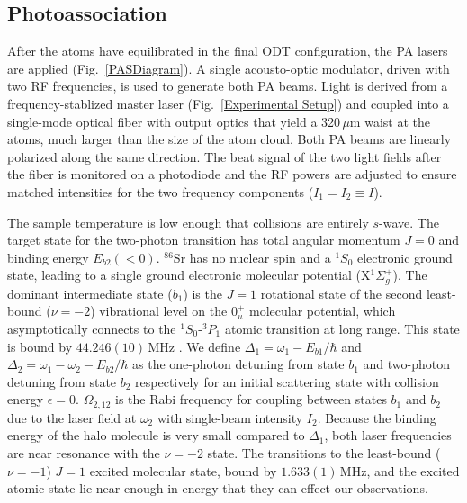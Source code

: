 \subsection{Photoassociation}

After the atoms have equilibrated in the final ODT configuration, the PA lasers are applied (Fig.\ \ref{PASDiagram}). A single acousto-optic modulator, driven with two RF frequencies, is used to generate both PA beams. Light is derived from a frequency-stablized master laser (Fig.\ \ref{Experimental Setup}) and coupled into a single-mode optical fiber with output optics that yield a 320\,$\mu$m waist at the atoms, much larger than the size of the atom cloud. Both PA beams are linearly polarized along the same direction. The beat signal of the two light fields after the fiber is monitored on a photodiode and the RF powers are adjusted to ensure matched intensities for the two frequency components ($I_1=I_2\equiv I$).



The sample temperature is low enough that collisions are entirely $s$-wave. The target state for the two-photon transition has total angular momentum $J=0$ and binding energy $E_{b2}(<0)$. $^{86}$Sr has no nuclear spin and a $^1S_0$ electronic ground state, leading to a single ground electronic molecular potential (X$^1\Sigma_g^+$). The dominant intermediate state ($b_1$) is the $J=1$ rotational state of the second least-bound ($\nu=-2$) vibrational level on the $0^+_u$ molecular potential, which asymptotically connects to the $^1S_0$-$^3P_1$ atomic transition at long range. This state is bound by $44.246(10)$\,MHz \cite{bmc14}. We define $\Delta_1=\omega_1-E_{b1}/\hbar$ and $\Delta_2=\omega_1-\omega_2-E_{b2}/\hbar$ as the one-photon detuning from state $b_1$ and two-photon detuning from state $b_2$ respectively for an initial scattering state with collision energy $\epsilon=0$.
$\Omega_{2,12}$ is the Rabi frequency for coupling between states $b_1$ and $b_2$ due to the laser field at $\omega_2$ with single-beam intensity $I_2$.
Because the binding energy of the halo molecule is very small compared to $\Delta_1$, both laser frequencies are near resonance with the $\nu=-2$ state.  The transitions to the least-bound ($\nu=-1$) $J=1$ excited molecular state, bound by $1.633(1)$\,MHz, and the excited atomic state lie near enough in energy that they can effect our observations.


